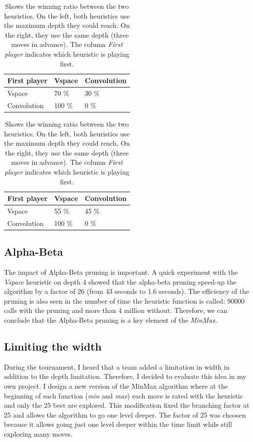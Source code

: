 \documentclass[runningheads]{llncs}
\begin{document}
\begin{table}
	\begin{subtable}{0.5\textwidth}
		\centering
		\caption{Optimal depth}\label{tab:win-heuristic}
		\begin{tabular}{|l|l|l|}
		\hline
		First player &  Vspace & Convolution\\
		\hline
		 Vspace 		 &  70 \% & 30 \%\\
		 Convolution &  100 \% & 0 \%\\
		\hline
		\end{tabular}
	\end{subtable}
	\begin{subtable}{0.49\textwidth}
		\centering
		\caption{Same depth}\label{tab:win-heuristic-same}
		\begin{tabular}{|l|l|l|}
		\hline
		First player &  Vspace & Convolution\\
		\hline
		 Vspace 		 &  55 \% & 45 \%\\
		 Convolution &  100 \% & 0 \%\\
		\hline
		\end{tabular}
	\end{subtable}
	\caption{Shows the winning ratio between the two
		heuristics. On the left, both heuristics use
		the maximum depth they could reach. On the
		right, they use the same depth (three moves
		in advance). The column \textit{First player}
		indicates which heuristic is playing first.}
\end{table}

\subsection{Alpha-Beta}
The impact of Alpha-Beta pruning is important. A
quick experiment with the \textit{Vspace}
heuristic on depth 4 showed that the alpha-beta
pruning speed-up the algorithm by a factor of 26
(from 43 seconds to 1.6 seconds). The efficiency
of the pruning is also seen in the number of time the
heuristic function is called: 90000 calls with the
pruning and more than 4 million without.
Therefore, we can conclude that the Alpha-Beta
pruning is a key element of the \textit{MinMax}.

\subsection{Limiting the width}
During the tournament, I heard that a team added a
limitation in width in addition to the depth
limitation.
Therefore, I decided to evaluate this idea in my
own project. I design a new version of the MinMax
algorithm where at the beginning of each function
(\textit{min} and \textit{max}) each move is rated
with the heuristic and only the 25 best are
explored. This modification fixed the branching
factor at 25 and allows the algorithm to go
one level deeper. The factor of 25 was choosen
because it allows going just one level deeper
within the time limit while still exploring many
moves.
\end{document}
